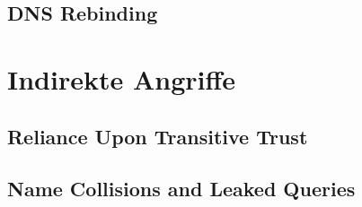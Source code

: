 \subsection{DNS Rebinding}



\section{Indirekte Angriffe}

\subsection{Reliance Upon Transitive Trust}


\subsection{Name Collisions and Leaked Queries} 

